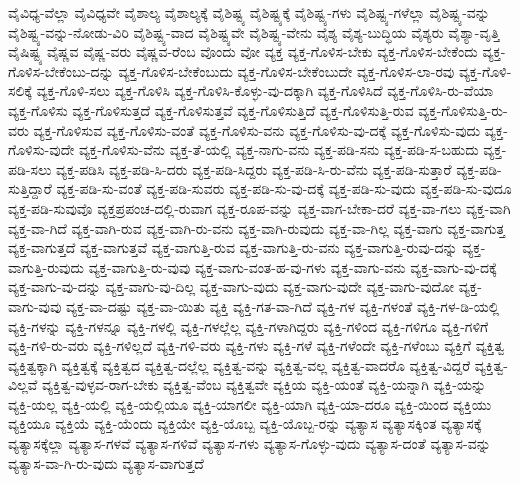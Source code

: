 {ವೈವಿಧ್ಯ-ವೆಲ್ಲಾ
ವೈವಿಧ್ಯವೇ
ವೈಶಾಲ್ಯ
ವೈಶಾಲ್ಯಕ್ಕೆ
ವೈಶಿಷ್ಟ್ಯ
ವೈಶಿಷ್ಟ್ಯಕ್ಕೆ
ವೈಶಿಷ್ಟ್ಯ-ಗಳು
ವೈಶಿಷ್ಟ್ಯ-ಗಳೆಲ್ಲಾ
ವೈಶಿಷ್ಟ್ಯ-ವನ್ನು
ವೈಶಿಷ್ಟ್ಯ-ವನ್ನು-ನೋಡು-ವಿರಿ
ವೈಶಿಷ್ಟ್ಯ-ವಾದ
ವೈಶಿಷ್ಟ್ಯವೇ
ವೈಶಿಷ್ಟ್ಯ-ವೇನು
ವೈಶ್ಯ
ವೈಶ್ಯ-ಬುದ್ಧಿಯ
ವೈಶ್ಯರು
ವೈಶ್ಯಾ-ವೃತ್ತಿ
ವೈಷಿಷ್ಟ್ಯ
ವೈಷ್ಣವ
ವೈಷ್ಣ-ವರು
ವೈಷ್ಣವ-ರೆಂಬ
ವೊಂದು
ವೋ
ವ್ಯಕ್ತ
ವ್ಯಕ್ತ-ಗೊಳಿಸ-ಬೇಕು
ವ್ಯಕ್ತ-ಗೊಳಿಸ-ಬೇಕೆಂದು
ವ್ಯಕ್ತ-ಗೊಳಿಸ-ಬೇಕೆಂಬು-ದನ್ನು
ವ್ಯಕ್ತ-ಗೊಳಿಸ-ಬೇಕೆಂಬುದು
ವ್ಯಕ್ತ-ಗೊಳಿಸ-ಬೇಕೆಂಬುದೇ
ವ್ಯಕ್ತ-ಗೊಳಿಸ-ಲಾ-ರವು
ವ್ಯಕ್ತ-ಗೊಳಿ-ಸಲಿಕ್ಕೆ
ವ್ಯಕ್ತ-ಗೊಳಿ-ಸಲು
ವ್ಯಕ್ತ-ಗೊಳಿಸಿ
ವ್ಯಕ್ತ-ಗೊಳಿಸಿ-ಕೊಳ್ಳು-ವು-ದಕ್ಕಾಗಿ
ವ್ಯಕ್ತ-ಗೊಳಿಸಿದೆ
ವ್ಯಕ್ತ-ಗೊಳಿಸಿ-ರು-ವೆಯಾ
ವ್ಯಕ್ತ-ಗೊಳಿಸು
ವ್ಯಕ್ತ-ಗೊಳಿಸುತ್ತದೆ
ವ್ಯಕ್ತ-ಗೊಳಿಸುತ್ತವೆ
ವ್ಯಕ್ತ-ಗೊಳಿಸುತ್ತಿದೆ
ವ್ಯಕ್ತ-ಗೊಳಿಸುತ್ತಿ-ರುವ
ವ್ಯಕ್ತ-ಗೊಳಿಸುತ್ತಿ-ರು-ವರು
ವ್ಯಕ್ತ-ಗೊಳಿಸುವ
ವ್ಯಕ್ತ-ಗೊಳಿಸು-ವಂತೆ
ವ್ಯಕ್ತ-ಗೊಳಿಸು-ವನು
ವ್ಯಕ್ತ-ಗೊಳಿಸು-ವು-ದಕ್ಕೆ
ವ್ಯಕ್ತ-ಗೊಳಿಸು-ವುದು
ವ್ಯಕ್ತ-ಗೊಳಿಸು-ವುದೇ
ವ್ಯಕ್ತ-ಗೊಳಿಸು-ವೆನು
ವ್ಯಕ್ತ-ತೆ-ಯಲ್ಲಿ
ವ್ಯಕ್ತ-ನಾಗು-ವನು
ವ್ಯಕ್ತ-ಪಡಿ-ಸನು
ವ್ಯಕ್ತ-ಪಡಿ-ಸ-ಬಹುದು
ವ್ಯಕ್ತ-ಪಡಿ-ಸಲು
ವ್ಯಕ್ತ-ಪಡಿಸಿ
ವ್ಯಕ್ತ-ಪಡಿ-ಸಿ-ದರು
ವ್ಯಕ್ತ-ಪಡಿ-ಸಿದ್ದರು
ವ್ಯಕ್ತ-ಪಡಿ-ಸಿ-ರು-ವೆನು
ವ್ಯಕ್ತ-ಪಡಿ-ಸುತ್ತಾರೆ
ವ್ಯಕ್ತ-ಪಡಿ-ಸುತ್ತಿದ್ದಾರೆ
ವ್ಯಕ್ತ-ಪಡಿ-ಸು-ವಂತೆ
ವ್ಯಕ್ತ-ಪಡಿ-ಸುವರು
ವ್ಯಕ್ತ-ಪಡಿ-ಸು-ವು-ದಕ್ಕೆ
ವ್ಯಕ್ತ-ಪಡಿ-ಸು-ವುದು
ವ್ಯಕ್ತ-ಪಡಿ-ಸು-ವುದೂ
ವ್ಯಕ್ತ-ಪಡಿ-ಸುವುವೊ
ವ್ಯಕ್ತಪ್ರಪಂಚ-ದಲ್ಲಿ-ರುವಾಗ
ವ್ಯಕ್ತ-ರೂಪ-ವನ್ನು
ವ್ಯಕ್ತ-ವಾಗ-ಬೇಕಾ-ದರೆ
ವ್ಯಕ್ತ-ವಾ-ಗಲು
ವ್ಯಕ್ತ-ವಾಗಿ
ವ್ಯಕ್ತ-ವಾ-ಗಿದೆ
ವ್ಯಕ್ತ-ವಾಗಿ-ರುವ
ವ್ಯಕ್ತ-ವಾಗಿ-ರು-ವನು
ವ್ಯಕ್ತ-ವಾಗಿ-ರುವುದು
ವ್ಯಕ್ತ-ವಾ-ಗಿಲ್ಲ
ವ್ಯಕ್ತ-ವಾಗು
ವ್ಯಕ್ತ-ವಾಗುತ್ತ
ವ್ಯಕ್ತ-ವಾಗುತ್ತದೆ
ವ್ಯಕ್ತ-ವಾಗುತ್ತವೆ
ವ್ಯಕ್ತ-ವಾಗುತ್ತಿ-ರುವ
ವ್ಯಕ್ತ-ವಾಗುತ್ತಿ-ರು-ವನು
ವ್ಯಕ್ತ-ವಾಗುತ್ತಿ-ರುವು-ದನ್ನು
ವ್ಯಕ್ತ-ವಾಗುತ್ತಿ-ರುವುದು
ವ್ಯಕ್ತ-ವಾಗುತ್ತಿ-ರು-ವುವು
ವ್ಯಕ್ತ-ವಾಗು-ವಂತ-ಹ-ವು-ಗಳು
ವ್ಯಕ್ತ-ವಾಗು-ವನು
ವ್ಯಕ್ತ-ವಾಗು-ವು-ದಕ್ಕೆ
ವ್ಯಕ್ತ-ವಾಗು-ವು-ದನ್ನು
ವ್ಯಕ್ತ-ವಾಗು-ವು-ದಿಲ್ಲ
ವ್ಯಕ್ತ-ವಾಗು-ವುದು
ವ್ಯಕ್ತ-ವಾಗು-ವುದೇ
ವ್ಯಕ್ತ-ವಾಗು-ವುದೋ
ವ್ಯಕ್ತ-ವಾಗು-ವುವು
ವ್ಯಕ್ತ-ವಾ-ದಷ್ಟು
ವ್ಯಕ್ತ-ವಾ-ಯಿತು
ವ್ಯಕ್ತಿ
ವ್ಯಕ್ತಿ-ಗತ-ವಾ-ಗಿದೆ
ವ್ಯಕ್ತಿ-ಗಳ
ವ್ಯಕ್ತಿ-ಗಳಂತೆ
ವ್ಯಕ್ತಿ-ಗಳ-ಡಿ-ಯಲ್ಲಿ
ವ್ಯಕ್ತಿ-ಗಳನ್ನು
ವ್ಯಕ್ತಿ-ಗಳನ್ನೂ
ವ್ಯಕ್ತಿ-ಗಳಲ್ಲಿ
ವ್ಯಕ್ತಿ-ಗಳಲ್ಲೆಲ್ಲ
ವ್ಯಕ್ತಿ-ಗಳಾಗಿದ್ದರು
ವ್ಯಕ್ತಿ-ಗಳಿಂದ
ವ್ಯಕ್ತಿ-ಗಳಿಗೂ
ವ್ಯಕ್ತಿ-ಗಳಿಗೆ
ವ್ಯಕ್ತಿ-ಗಳಿ-ರು-ವರು
ವ್ಯಕ್ತಿ-ಗಳಿಲ್ಲದೆ
ವ್ಯಕ್ತಿ-ಗಳಿ-ವರು
ವ್ಯಕ್ತಿ-ಗಳು
ವ್ಯಕ್ತಿ-ಗಳೆ
ವ್ಯಕ್ತಿ-ಗಳೆಂದೇ
ವ್ಯಕ್ತಿ-ಗಳೆಂಬು
ವ್ಯಕ್ತಿಗೆ
ವ್ಯಕ್ತಿತ್ವ
ವ್ಯಕ್ತಿತ್ವಕ್ಕಾಗಿ
ವ್ಯಕ್ತಿತ್ವಕ್ಕೆ
ವ್ಯಕ್ತಿತ್ವದ
ವ್ಯಕ್ತಿತ್ವ-ದಲ್ಲೆಲ್ಲ
ವ್ಯಕ್ತಿತ್ವ-ವನ್ನು
ವ್ಯಕ್ತಿತ್ವ-ವಲ್ಲ
ವ್ಯಕ್ತಿತ್ವ-ವಾದರೊ
ವ್ಯಕ್ತಿತ್ವ-ವಿದ್ದರೆ
ವ್ಯಕ್ತಿತ್ವ-ವಿಲ್ಲವೆ
ವ್ಯಕ್ತಿತ್ವ-ವುಳ್ಳವ-ರಾಗ-ಬೇಕು
ವ್ಯಕ್ತಿತ್ವ-ವೆಂಬ
ವ್ಯಕ್ತಿತ್ವವೇ
ವ್ಯಕ್ತಿಯ
ವ್ಯಕ್ತಿ-ಯಂತೆ
ವ್ಯಕ್ತಿ-ಯನ್ನಾಗಿ
ವ್ಯಕ್ತಿ-ಯನ್ನು
ವ್ಯಕ್ತಿ-ಯಲ್ಲ
ವ್ಯಕ್ತಿ-ಯಲ್ಲಿ
ವ್ಯಕ್ತಿ-ಯಲ್ಲಿಯೂ
ವ್ಯಕ್ತಿ-ಯಾಗಲೀ
ವ್ಯಕ್ತಿ-ಯಾಗಿ
ವ್ಯಕ್ತಿ-ಯಾ-ದರೂ
ವ್ಯಕ್ತಿ-ಯಿಂದ
ವ್ಯಕ್ತಿಯು
ವ್ಯಕ್ತಿಯೂ
ವ್ಯಕ್ತಿಯೆ
ವ್ಯಕ್ತಿ-ಯೆಂದು
ವ್ಯಕ್ತಿಯೇ
ವ್ಯಕ್ತಿ-ಯೊಬ್ಬ
ವ್ಯಕ್ತಿ-ಯೊಬ್ಬ-ರನ್ನು
ವ್ಯತ್ಯಾಸ
ವ್ಯತ್ಯಾಸಕ್ಕಿಂತ
ವ್ಯತ್ಯಾಸಕ್ಕೆ
ವ್ಯತ್ಯಾಸಕ್ಕೆಲ್ಲಾ
ವ್ಯತ್ಯಾಸ-ಗಳವೆ
ವ್ಯತ್ಯಾಸ-ಗಳಿವೆ
ವ್ಯತ್ಯಾಸ-ಗಳು
ವ್ಯತ್ಯಾಸ-ಗೊಳ್ಳು-ವುದು
ವ್ಯತ್ಯಾಸ-ದಂತೆ
ವ್ಯತ್ಯಾಸ-ವನ್ನು
ವ್ಯತ್ಯಾಸ-ವಾ-ಗಿ-ರು-ವುದು
ವ್ಯತ್ಯಾಸ-ವಾಗುತ್ತದೆ
}
